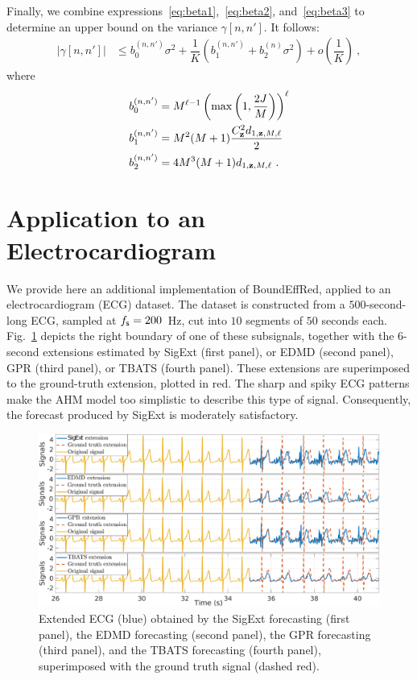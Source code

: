 \documentclass[journal,onecolumn]{IEEEtran}
\begin{document}
Finally, we combine expressions~\eqref{eq:beta1},~\eqref{eq:beta2}, and~\eqref{eq:beta3} to determine an upper bound on the variance $\gamma[n,n']$. It follows:
\begin{align*}
\left|\gamma[n,n']\right| &\leq b_0^{(n,n')}\sigma^2 + \dfrac{1}{K} \left( b_1^{(n,n')} + b_2^{(n)}\sigma^2\right) + o\left(\dfrac1K\right)\ ,
\end{align*}
where
\begin{align*}
b_0^{(n,n')} & =  M^{\ell-1}\left(\max\left(1,\frac{2J}{M}\right)\right)^{\ell} \\
b_1^{(n,n')} & = M^2(M+1)\dfrac{C_{\mathbf z}^2 d_{1,{\mathbf z},M,\ell}}{2} \\
b_2^{(n,n')} & = 4M^3(M+1)d_{1,{\mathbf z},M,\ell}  \ .
\end{align*}

\section{Application to an Electrocardiogram}
We provide here an additional implementation of {\sf BoundEffRed}, applied to an electrocardiogram (ECG) dataset. The dataset is constructed from a $500$-second-long ECG, sampled at $f_{\mathsf s}=200$~Hz, cut into $10$ segments of $50$ seconds each. Fig.~\ref{fig:ecg} depicts the right boundary of one of these subsignals, together with the $6$-second extensions estimated by {\sf SigExt} (first panel), or EDMD (second panel), GPR (third panel), or TBATS (fourth panel). These extensions are superimposed to the ground-truth extension, plotted in red. The sharp and spiky ECG patterns make the AHM model too simplistic to describe this type of signal. Consequently, the forecast produced by {\sf SigExt} is moderately satisfactory. 

\begin{figure}
\includegraphics[width=\textwidth]{ECGforecast.eps}
\caption{Extended ECG (blue) obtained by the {\sf SigExt} forecasting (first panel), the EDMD forecasting (second panel), the GPR forecasting (third panel), and the TBATS forecasting (fourth panel), superimposed with the ground truth signal (dashed red).}
\label{fig:ecg}
\end{figure}
\end{document}
